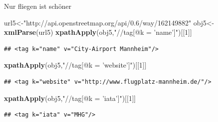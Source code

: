 \documentclass[ignorenonframetext,]{beamer}
\newenvironment{Shaded}{\begin{snugshade}}{\end{snugshade}}
\newcommand{\DecValTok}[1]{\textcolor[rgb]{0.00,0.00,0.81}{#1}}
\newcommand{\KeywordTok}[1]{\textcolor[rgb]{0.13,0.29,0.53}{\textbf{#1}}}
\newcommand{\NormalTok}[1]{#1}
\newcommand{\StringTok}[1]{\textcolor[rgb]{0.31,0.60,0.02}{#1}}
\begin{document}
\begin{frame}[fragile]{Nur fliegen ist schöner}
\protect\hypertarget{nur-fliegen-ist-schoner}{}

\begin{Shaded}
\begin{Highlighting}[]
\NormalTok{url5<-}\StringTok{"http://api.openstreetmap.org/api/0.6/way/162149882"}
\NormalTok{obj5<-}\KeywordTok{xmlParse}\NormalTok{(url5)}
\KeywordTok{xpathApply}\NormalTok{(obj5,}\StringTok{"//tag[@k = 'name']"}\NormalTok{)[[}\DecValTok{1}\NormalTok{]]}
\end{Highlighting}
\end{Shaded}

\begin{verbatim}
## <tag k="name" v="City-Airport Mannheim"/>
\end{verbatim}

\begin{Shaded}
\begin{Highlighting}[]
\KeywordTok{xpathApply}\NormalTok{(obj5,}\StringTok{"//tag[@k = 'website']"}\NormalTok{)[[}\DecValTok{1}\NormalTok{]]}
\end{Highlighting}
\end{Shaded}

\begin{verbatim}
## <tag k="website" v="http://www.flugplatz-mannheim.de/"/>
\end{verbatim}

\begin{Shaded}
\begin{Highlighting}[]
\KeywordTok{xpathApply}\NormalTok{(obj5,}\StringTok{"//tag[@k = 'iata']"}\NormalTok{)[[}\DecValTok{1}\NormalTok{]]}
\end{Highlighting}
\end{Shaded}

\begin{verbatim}
## <tag k="iata" v="MHG"/>
\end{verbatim}

\end{frame}
\end{document}
